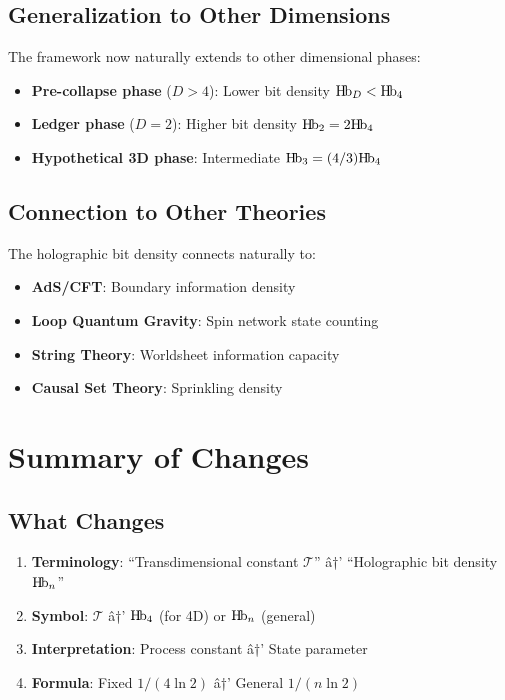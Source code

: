 \documentclass[11pt,a4paper]{article}
\newcommand{\Hb}{\textnormal{H\kern-0.12em b}}
\newcommand{\Hbn}{\Hb_n}
\newcommand{\Hbfour}{\Hb_4}
\newcommand{\Tc}{\mathcal{T}}
\begin{document}
\subsection{Generalization to Other Dimensions}

The framework now naturally extends to other dimensional phases:
\begin{itemize}[nosep]
    \item \textbf{Pre-collapse phase} ($D > 4$): Lower bit density $\Hb_D < \Hbfour$
    \item \textbf{Ledger phase} ($D = 2$): Higher bit density $\Hb_2 = 2\Hbfour$
    \item \textbf{Hypothetical 3D phase}: Intermediate $\Hb_3 = (4/3)\Hbfour$
\end{itemize}

\subsection{Connection to Other Theories}

The holographic bit density connects naturally to:
\begin{itemize}[nosep]
    \item \textbf{AdS/CFT}: Boundary information density
    \item \textbf{Loop Quantum Gravity}: Spin network state counting
    \item \textbf{String Theory}: Worldsheet information capacity
    \item \textbf{Causal Set Theory}: Sprinkling density
\end{itemize}

\section{Summary of Changes}
\label{sec:summary}

\subsection{What Changes}

\begin{enumerate}
    \item \textbf{Terminology}: ``Transdimensional constant $\Tc$'' â†’ ``Holographic bit density $\Hbn$''
    
    \item \textbf{Symbol}: $\Tc$ â†’ $\Hbfour$ (for 4D) or $\Hbn$ (general)
    
    \item \textbf{Interpretation}: Process constant â†’ State parameter
    
    \item \textbf{Formula}: Fixed $1/(4\ln 2)$ â†’ General $1/(n\ln 2)$
\end{enumerate}
\end{document}
